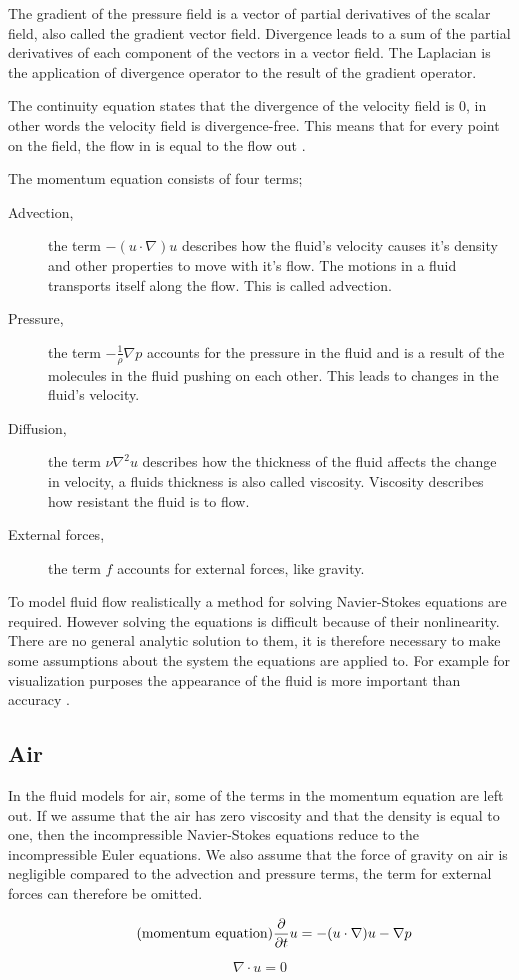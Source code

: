The gradient of the pressure field is a vector of partial derivatives of the 
scalar field, also called the gradient vector field. Divergence leads to a sum of 
the partial derivatives of each component of the vectors in a vector field. The 
Laplacian is the application of divergence operator to the result of the gradient 
operator. 

The continuity equation states that the divergence of the 
velocity field is 0, in other words the velocity field is divergence-free. This 
means that for every point on the field, the flow in is equal to the flow out
\cite{originalSnowThesis}. 

The momentum equation consists of four terms;
\begin{description}
	\item[Advection,] the term $-(u \cdot \nabla)u$ describes how the fluid's 
	velocity causes it's density and other properties to move with it's flow. 
	The motions in a fluid transports itself along the flow. This is called 
	advection. 
	\item[Pressure,] the term $-\frac{1}{\rho}\nabla p$ accounts for the pressure 
	in the fluid and is a result of the molecules in the fluid pushing on each 
	other. This leads to changes in the fluid's velocity. 
	\item[Diffusion,] the term $\nu \nabla^2 u$ describes how the thickness of the 
	fluid affects the change in velocity, a fluids thickness is also called viscosity. 
	Viscosity describes how resistant the fluid is to flow. 
	\item[External forces,] the term $f$ accounts for external forces, like gravity.
\end{description}

To model fluid flow realistically a method for solving Navier-Stokes equations are 
required. However solving the equations is difficult because of their nonlinearity. 
There are no general analytic solution to them, it is therefore necessary to make 
some assumptions about the system the equations are applied to. For example for 
visualization purposes the appearance of the fluid is more important than accuracy 
\cite{smokeAndFire}. 

\subsection{Air}

In the fluid models for air, some of the terms in the momentum equation are left 
out. If we assume that the air has zero viscosity and that the density is equal 
to one, then the incompressible Navier-Stokes equations reduce to the incompressible 
Euler equations. We also assume that the force of gravity on air is negligible 
compared to the advection and pressure terms, the term for external forces can 
therefore be omitted\cite{originalSnowThesis}. 

\begin{equation} 
	\tag{momentum equation}
	\frac{\partial}{\partial t}u  = -(u \cdot \nabla)u - \nabla p
\end{equation}

\begin{equation}
	\tag{continuity equation}
	\nabla \cdot u = 0
\end{equation}
